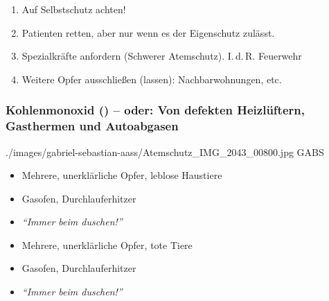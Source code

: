 {{\begin{enumerate}
  \item Auf Selbstschutz achten!
  \item Patienten retten, aber nur wenn es der
  Eigenschutz zulässt.
%   
  \item Spezialkräfte anfordern (Schwerer Atemschutz).
  I.\,d.\,R. Feuerwehr
  \item Weitere Opfer ausschließen (lassen):
  Nachbarwohnungen, etc.
\end{enumerate}
}


\subsubsection{Kohlenmonoxid () -- oder: Von defekten
Heizlüftern, Gasthermen und Autoabgasen}

{}
{./images/gabriel-sebastian-aass/Atemschutz_IMG_2043_00800.jpg}
{}
{GABS}




{
\begin{itemize}
    \item Mehrere, unerklärliche Opfer, leblose Haustiere
    \item Gasofen, Durchlauferhitzer
    \item \emph{\enquote{Immer beim duschen!}}
\end{itemize}
}{
\begin{itemize}
    \item Mehrere, unerklärliche Opfer, tote Tiere
    \item Gasofen, Durchlauferhitzer
    \item \emph{\enquote{Immer beim duschen!}}
\end{itemize}
}{}{}{}

}
